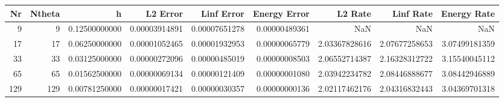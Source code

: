 \begin{tabular}{rrrrrrrrr}
\toprule
Nr & Ntheta & h & L2 Error & Linf Error & Energy Error & L2 Rate & Linf Rate & Energy Rate \\
\midrule
9 & 9 & 0.12500000000 & 0.00003914891 & 0.00007651278 & 0.00000489361 & NaN & NaN & NaN \\
17 & 17 & 0.06250000000 & 0.00001052465 & 0.00001932953 & 0.00000065779 & 2.03367828616 & 2.07677258653 & 3.07499181359 \\
33 & 33 & 0.03125000000 & 0.00000272096 & 0.00000485019 & 0.00000008503 & 2.06552714387 & 2.16328312722 & 3.15540045112 \\
65 & 65 & 0.01562500000 & 0.00000069134 & 0.00000121409 & 0.00000001080 & 2.03942234782 & 2.08446888677 & 3.08442946889 \\
129 & 129 & 0.00781250000 & 0.00000017421 & 0.00000030357 & 0.00000000136 & 2.02117462176 & 2.04316832443 & 3.04369701318 \\
\bottomrule
\end{tabular}
